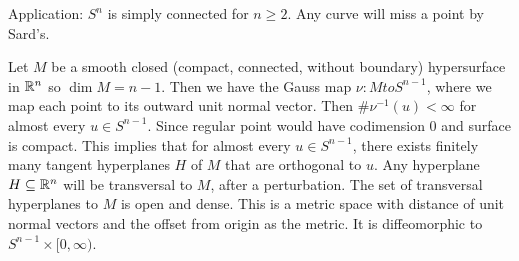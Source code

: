 \documentclass[12pt,class=article,crop=false]{standalone}
\begin{document}
\begin{eg}
Application: $ S^{n}$ is simply connected for $ n \geq 2$. Any curve will miss a point by Sard's.
\end{eg}
\begin{eg}
	Let $ M$ be a smooth closed (compact, connected, without boundary) hypersurface in  $ \mathbb{R}^{n}$ so $ \dim M = n-1$. Then we have the Gauss map  $ \nu: M to S^{n-1}$, where we map each point to its outward unit normal vector. Then $ \# \nu^{-1}(u)< \infty$ for almost every $ u \in S^{n-1}$. Since regular point would have codimension 0 and surface is compact. This implies that for almost every $ u \in S^{n-1}$, there exists finitely many tangent hyperplanes $ H$ of  $ M$ that are orthogonal to  $ u$. Any hyperplane $ H \subseteq \mathbb{R}^{n}$ will be transversal to $ M$, after a perturbation. The set of transversal hyperplanes to $ M$ is open and dense. This is a metric space with distance of unit normal vectors and the offset from origin as the metric. It is diffeomorphic to  $ S^{n-1} \times [0, \infty)$.
\end{eg}
\end{document}
